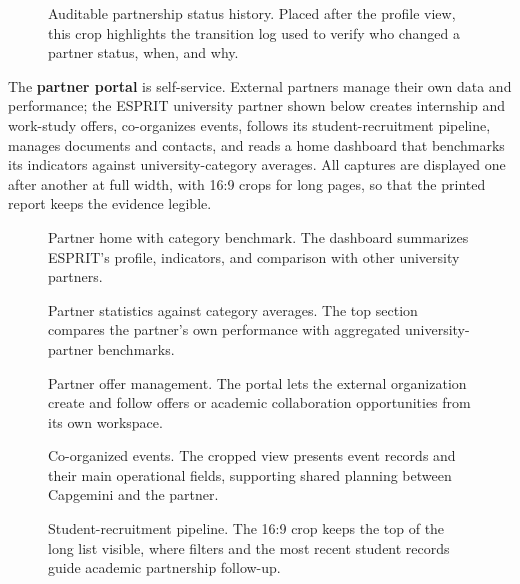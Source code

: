 \begin{figure}[p]
  \centering
  \caption{Auditable partnership status history. Placed after the profile view, this crop highlights the transition log used to verify who changed a partner status, when, and why.}
  \label{fig:employee-status-history-view}
\end{figure}

The \textbf{partner portal} is self-service. External partners manage their own data and performance; the ESPRIT university partner shown below creates internship and work-study offers, co-organizes events, follows its student-recruitment pipeline, manages documents and contacts, and reads a home dashboard that benchmarks its indicators against university-category averages. All captures are displayed one after another at full width, with 16:9 crops for long pages, so that the printed report keeps the evidence legible.

\begin{figure}[p]
  \centering
  \caption{Partner home with category benchmark. The dashboard summarizes ESPRIT's profile, indicators, and comparison with other university partners.}
  \label{fig:partner-home-view}
\end{figure}

\begin{figure}[p]
  \centering
  \caption{Partner statistics against category averages. The top section compares the partner's own performance with aggregated university-partner benchmarks.}
  \label{fig:partner-stats-view}
\end{figure}

\begin{figure}[p]
  \centering
  \caption{Partner offer management. The portal lets the external organization create and follow offers or academic collaboration opportunities from its own workspace.}
  \label{fig:partner-offers-view}
\end{figure}

\begin{figure}[p]
  \centering
  \caption{Co-organized events. The cropped view presents event records and their main operational fields, supporting shared planning between Capgemini and the partner.}
  \label{fig:partner-events-view}
\end{figure}

\begin{figure}[p]
  \centering
  \caption{Student-recruitment pipeline. The 16:9 crop keeps the top of the long list visible, where filters and the most recent student records guide academic partnership follow-up.}
  \label{fig:partner-recruitments-view}
\end{figure}


